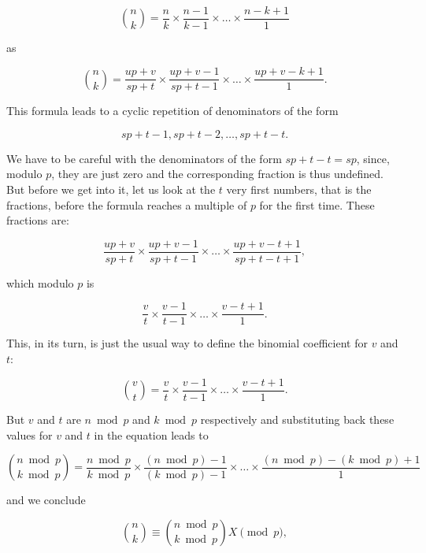 \documentclass[tikz]{scrreprt}
\begin{document}
\begin{equation}
\binom{n}{k} = \frac{n}{k} \times \frac{n-1}{k-1} \times \dots \times \frac{n-k+1}{1}
\end{equation}

as

\begin{equation}
\binom{n}{k} = \frac{up + v}{sp+t} \times \frac{up+v-1}{sp+t-1} \times \dots 
        \times \frac{up+v-k+1}{1}.
\end{equation}

This formula leads to a
cyclic repetition of denominators of the form

\[
sp + t - 1, sp + t - 2, \dots, sp + t - t.
\]

We have to be careful with the denominators
of the form $sp + t - t = sp$, since, modulo $p$,
they are just zero and the corresponding
fraction is thus undefined.
But before we get into it, 
let us look at the $t$ very first numbers,
that is the fractions, before the formula
reaches a multiple of $p$ for the first time.
These fractions are:

\[
\frac{up+v}{sp+t} \times
\frac{up+v-1}{sp+t-1} \times \dots \times
\frac{up+v-t+1}{sp+t-t+1},
\]

which modulo $p$ is 

\[
\frac{v}{t} \times
\frac{v-1}{t-1} \times \dots \times
\frac{v-t+1}{1}.
\]

This, in its turn, is just
the usual way to define the
binomial coefficient for $v$ and $t$:

\begin{equation}
\binom{v}{t} = 
\frac{v}{t} \times
\frac{v-1}{t-1} \times \dots \times
\frac{v-t+1}{1}.
\end{equation}

But $v$ and $t$ are
$n \bmod p$ and $k \bmod p$ respectively
and substituting back these values for $v$ and $t$
in the equation leads to

\begin{equation}
\binom{n \bmod p}{k \bmod p} = 
\frac{n \bmod p}{k \bmod p} \times
\frac{(n \bmod p)-1}{(k \bmod p)-1} \times \dots \times
\frac{(n \bmod p)-(k \bmod p)+1}{1}
\end{equation}

and we conclude 

\begin{equation}\label{eq:lucasX}
\binom{n}{k} \equiv \binom{n \bmod p}{k \bmod p} X \pmod{p},
\end{equation}
\end{document}
